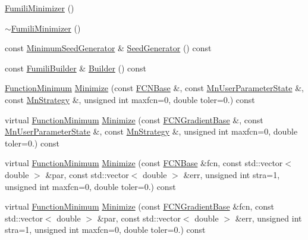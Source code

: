 \begin{DoxyCompactItemize}
\item 
\mbox{\hyperlink{classROOT_1_1Minuit2_1_1FumiliMinimizer_af33036073afd0161dbe9fd2fe0866575}{Fumili\+Minimizer}} ()
\item 
\mbox{\hyperlink{classROOT_1_1Minuit2_1_1FumiliMinimizer_a2e482171de26d153b98228aa41adee3e}{$\sim$\+Fumili\+Minimizer}} ()
\item 
const \mbox{\hyperlink{classROOT_1_1Minuit2_1_1MinimumSeedGenerator}{Minimum\+Seed\+Generator}} \& \mbox{\hyperlink{classROOT_1_1Minuit2_1_1FumiliMinimizer_ad8906dbac7f0c20284e361be606d5634}{Seed\+Generator}} () const
\item 
const \mbox{\hyperlink{classROOT_1_1Minuit2_1_1FumiliBuilder}{Fumili\+Builder}} \& \mbox{\hyperlink{classROOT_1_1Minuit2_1_1FumiliMinimizer_a24d20e7cd4a335f60616fd7cafe0739c}{Builder}} () const
\item 
\mbox{\hyperlink{classROOT_1_1Minuit2_1_1FunctionMinimum}{Function\+Minimum}} \mbox{\hyperlink{classROOT_1_1Minuit2_1_1FumiliMinimizer_a3da0ec7b2ba7f876809f72d2f3054eec}{Minimize}} (const \mbox{\hyperlink{classROOT_1_1Minuit2_1_1FCNBase}{F\+C\+N\+Base}} \&, const \mbox{\hyperlink{classROOT_1_1Minuit2_1_1MnUserParameterState}{Mn\+User\+Parameter\+State}} \&, const \mbox{\hyperlink{classROOT_1_1Minuit2_1_1MnStrategy}{Mn\+Strategy}} \&, unsigned int maxfcn=0, double toler=0.) const
\item 
virtual \mbox{\hyperlink{classROOT_1_1Minuit2_1_1FunctionMinimum}{Function\+Minimum}} \mbox{\hyperlink{classROOT_1_1Minuit2_1_1FumiliMinimizer_a2bffd3a7c3090b841f8c23248b83b16e}{Minimize}} (const \mbox{\hyperlink{classROOT_1_1Minuit2_1_1FCNGradientBase}{F\+C\+N\+Gradient\+Base}} \&, const \mbox{\hyperlink{classROOT_1_1Minuit2_1_1MnUserParameterState}{Mn\+User\+Parameter\+State}} \&, const \mbox{\hyperlink{classROOT_1_1Minuit2_1_1MnStrategy}{Mn\+Strategy}} \&, unsigned int maxfcn=0, double toler=0.) const
\item 
virtual \mbox{\hyperlink{classROOT_1_1Minuit2_1_1FunctionMinimum}{Function\+Minimum}} \mbox{\hyperlink{classROOT_1_1Minuit2_1_1FumiliMinimizer_ab9ec6dd4a0e664db7d23a3ea3b0a3c75}{Minimize}} (const \mbox{\hyperlink{classROOT_1_1Minuit2_1_1FCNBase}{F\+C\+N\+Base}} \&fcn, const std\+::vector$<$ double $>$ \&par, const std\+::vector$<$ double $>$ \&err, unsigned int stra=1, unsigned int maxfcn=0, double toler=0.) const
\item 
virtual \mbox{\hyperlink{classROOT_1_1Minuit2_1_1FunctionMinimum}{Function\+Minimum}} \mbox{\hyperlink{classROOT_1_1Minuit2_1_1FumiliMinimizer_a2bb7832765e33c24ffad4636ad3b7193}{Minimize}} (const \mbox{\hyperlink{classROOT_1_1Minuit2_1_1FCNGradientBase}{F\+C\+N\+Gradient\+Base}} \&fcn, const std\+::vector$<$ double $>$ \&par, const std\+::vector$<$ double $>$ \&err, unsigned int stra=1, unsigned int maxfcn=0, double toler=0.) const

\end{DoxyCompactItemize}
